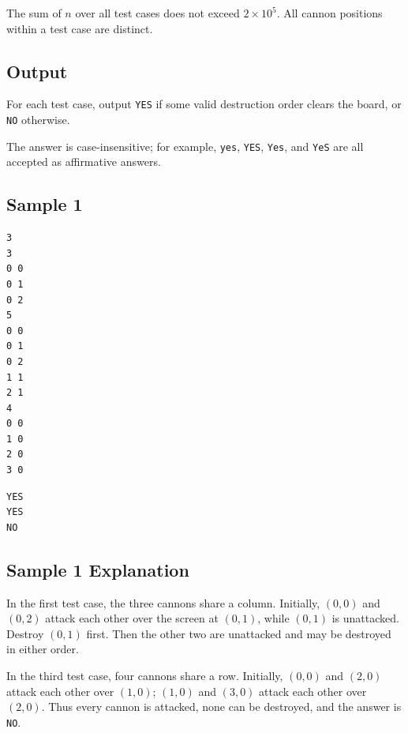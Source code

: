 The sum of $n$ over all test cases does not exceed $2 \times 10^5$. All cannon positions within a test case are distinct.

\subsection{Output}

For each test case, output \texttt{YES} if some valid destruction order clears the board, or \texttt{NO} otherwise.

The answer is case-insensitive; for example, \texttt{yes}, \texttt{YES}, \texttt{Yes}, and \texttt{YeS} are all accepted as affirmative answers.

\subsection{Sample 1}

\begin{minipage}{\linewidth}
	\begin{minipage}[t]{0.49\linewidth}
		\begin{lstlisting}[title=\texttt{standard input}]
3
3
0 0
0 1
0 2
5
0 0
0 1
0 2
1 1
2 1
4
0 0
1 0
2 0
3 0
\end{lstlisting}
	\end{minipage}
	\begin{minipage}[t]{0.49\linewidth}
		\begin{lstlisting}[title=\texttt{standard output}]
YES
YES
NO
\end{lstlisting}
	\end{minipage}
\end{minipage}


\subsection{Sample 1 Explanation}

In the first test case, the three cannons share a column. Initially, $(0,0)$ and $(0,2)$ attack each other over the screen at $(0,1)$, while $(0,1)$ is unattacked. Destroy $(0,1)$ first. Then the other two are unattacked and may be destroyed in either order.

In the third test case, four cannons share a row. Initially, $(0,0)$ and $(2,0)$ attack each other over $(1,0)$; $(1,0)$ and $(3,0)$ attack each other over $(2,0)$. Thus every cannon is attacked, none can be destroyed, and the answer is \texttt{NO}.
